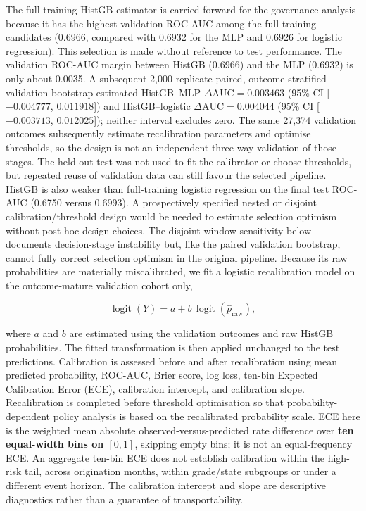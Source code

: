 \documentclass[10pt]{article}
\begin{document}
The full-training HistGB estimator is carried forward for the governance analysis because it has the highest validation ROC-AUC among the full-training candidates (0.6966, compared with 0.6932 for the MLP and 0.6926 for logistic regression). This selection is made without reference to test performance. The validation ROC-AUC margin between HistGB (0.6966) and the MLP (0.6932) is only about 0.0035. A subsequent 2,000-replicate paired, outcome-stratified validation bootstrap estimated HistGB--MLP $\Delta\mathrm{AUC}=0.003463$ (95\% CI [$-0.004777$, $0.011918$]) and HistGB--logistic $\Delta\mathrm{AUC}=0.004044$ (95\% CI [$-0.003713$, $0.012025$]); neither interval excludes zero. The same 27,374 validation outcomes subsequently estimate recalibration parameters and optimise thresholds, so the design is not an independent three-way validation of those stages. The held-out test was not used to fit the calibrator or choose thresholds, but repeated reuse of validation data can still favour the selected pipeline. HistGB is also weaker than full-training logistic regression on the final test ROC-AUC (0.6750 versus 0.6993). A prospectively specified nested or disjoint calibration/threshold design would be needed to estimate selection optimism without post-hoc design choices. The disjoint-window sensitivity below documents decision-stage instability but, like the paired validation bootstrap, cannot fully correct selection optimism in the original pipeline. Because its raw probabilities are materially miscalibrated, we fit a logistic recalibration model on the outcome-mature validation cohort only,

\[
\operatorname{logit}(Y)=a+b\,\operatorname{logit}(\hat p_{\mathrm{raw}}),
\]

where $a$ and $b$ are estimated using the validation outcomes and raw HistGB probabilities. The fitted transformation is then applied unchanged to the test predictions. Calibration is assessed before and after recalibration using mean predicted probability, ROC-AUC, Brier score, log loss, ten-bin Expected Calibration Error (ECE), calibration intercept, and calibration slope. Recalibration is completed before threshold optimisation so that probability-dependent policy analysis is based on the recalibrated probability scale. ECE here is the weighted mean absolute observed-versus-predicted rate difference over \textbf{ten equal-width bins on $[0,1]$}, skipping empty bins; it is not an equal-frequency ECE. An aggregate ten-bin ECE does not establish calibration within the high-risk tail, across origination months, within grade/state subgroups or under a different event horizon. The calibration intercept and slope are descriptive diagnostics rather than a guarantee of transportability.
\end{document}
